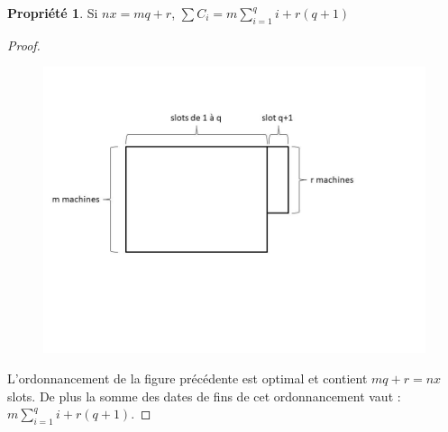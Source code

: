 \documentclass[12pt]{article}
\theoremstyle{definition}
\newtheorem{prop}{Propriété}
\begin{document}
\begin{prop}Si $nx = mq+r$, $\sum C_i = m\sum\limits_{i=1}^q i +r(q+1)$
\end{prop}
\begin{proof}
\begin{figure}[H]
\includegraphics[scale = 0.6]{somme_opt.jpg}
\end{figure}
L'ordonnancement de la figure précédente est optimal et contient $mq+r = nx$ slots. De plus la somme des dates de fins de cet ordonnancement vaut : $m\sum\limits_{i=1}^q i +r(q+1)$.
\end{proof}
\end{document}
